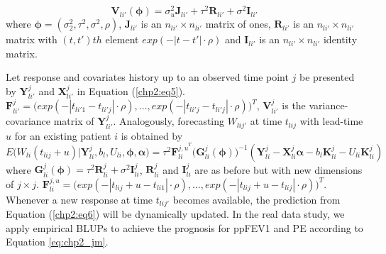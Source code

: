  \begin{equation}
    \bm{V}_{li'}(\bm{\phi})=\sigma_u^2\bm{J}_{li'}+\tau^2\bm{R}_{li'}+\sigma^2\bm{I}_{li'}
 \end{equation} 
 where $\bm{\phi}=(\sigma^2_2,\tau^2,\sigma^2,\rho)$, $\bm{J}_{li'}$ is an $n_{li'} \times n_{li'}$ matrix of ones, $\bm{R}_{li'}$ is an $n_{li'} \times n_{li'}$ matrix with $(t,t')th$ element $exp(-|t-t'| \cdot \rho)$ and $\bm{I}_{li'}$ is an $n_{li'} \times n_{li'}$ identity matrix.
 
 Let response and covariates history up to an observed time point $j$ be presented by $\bm{Y}_{li'}^j$ and  $\bm{X}_{li'}^j$ in Equation (\ref{chp2:eq5}). $\bm{F}^j_{li'}=\Big(exp(-|t_{li'1}-t_{li'j}| \cdot \rho), \dots, exp(-|t_{li'j}-t_{li'j}| \cdot \rho) \Big)^T$, $\bm{V}^j_{li'}$ is the variance-covariance matrix of $\bm{Y}^j_{li'}$. Analogously, forecasting $W_{lij'}$ at time $t_{lij}$ with lead-time $u$ for an existing patient $i$ is obtained by 
 \begin{equation}
  E\big(W_{li}(t_{lij}+u)|\bm{Y}^j_{li},b_l, U_{li},\bm{\phi}, \bm{\alpha}\big)  =  \tau^2\bm{F}^{{j,u}^T}_{li}\big(\bm{G}^j_{li}(\bm{\phi})\big)^{-1}(\bm{Y}^j_{li}-\bm{X}^{j}_{li}\bm{\alpha}-b_l\bm{K}^j_{li}-U_{li}\bm{K}^j_{li}) \label{chp2:eq6}
\end{equation}
where $\bm{G}^j_{li}(\bm{\phi})=\tau^2\bm{R}^j_{li}+\sigma^2\bm{I}^j_{li}$, $\bm{R}^j_{li}$ and $\bm{I}^j_{li}$ are as before but with new dimensions of $j \times j$. $\bm{F}^{j,u}_{li}=\Big(exp(-|t_{lij}+u-t_{li1}| \cdot \rho),\dots,exp(-|t_{lij}+u-t_{lij}| \cdot \rho) \Big)^T$. Whenever a new response at time $t_{lij'}$ becomes available, the prediction from Equation (\ref{chp2:eq6}) will be dynamically updated. 
In the real data study, we apply empirical BLUPs to achieve the prognosis for ppFEV1 and PE according to Equation \ref{eq:chp2_jm}. 


